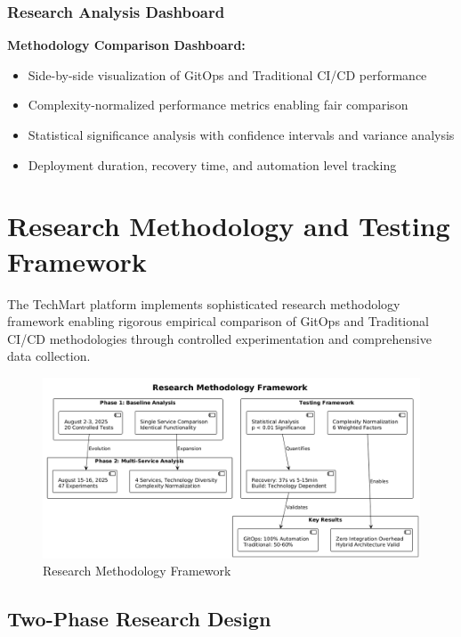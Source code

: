 \subsubsection{Research Analysis Dashboard}

\textbf{Methodology Comparison Dashboard:}
\begin{itemize}
\item Side-by-side visualization of GitOps and Traditional CI/CD performance
\item Complexity-normalized performance metrics enabling fair comparison
\item Statistical significance analysis with confidence intervals and variance analysis
\item Deployment duration, recovery time, and automation level tracking
\end{itemize}

\section{Research Methodology and Testing Framework}

The TechMart platform implements sophisticated research methodology framework enabling rigorous empirical comparison of GitOps and Traditional CI/CD methodologies through controlled experimentation and comprehensive data collection.

\begin{figure}[h]
\centering
\includegraphics[width=1.0\textwidth]{figures/Research-Methodology-Framework.png}
\caption{Research Methodology Framework}
\label{fig:research-methodology-framework}
\end{figure}

\subsection{Two-Phase Research Design}

